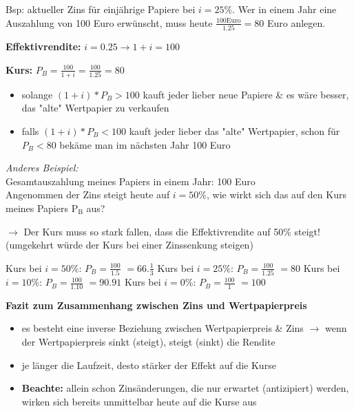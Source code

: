 \documentclass[11pt]{article}
\begin{document}
\begin{enumerate}
Bsp: aktueller Zins für einjährige Papiere bei \(i=25\%\).
Wer in einem Jahr eine Auszahlung von 100 Euro erwünscht, muss heute \(\frac{100\text{Euro}}{1.25}=80\) Euro anlegen.

\textbf{Effektivrendite:} \(i=0.25 \rightarrow 1 + i = 100\)

\textbf{Kurs:} \(P_B = \frac{100}{1+i} = \frac{100}{1.25} = 80\)

\begin{itemize}
\item solange \((1+i)*P_B > 100\) kauft jeder lieber neue Papiere \& es wäre besser, das "alte" Wertpapier zu verkaufen
\item falls \((1+i)*P_B < 100\) kauft jeder lieber das "alte" Wertpapier, schon für \(P_B < 80\) bekäme man im nächsten Jahr 100 Euro
\end{itemize}

\emph{Anderes Beispiel:}\\
Gesamtauszahlung meines Papiers in einem Jahr: 100 Euro\\
Angenommen der Zins steigt heute auf \(i=50\%\), wie wirkt sich das auf den Kurs meines Papiers P\(_{\text{B}}\) aus?

\(\rightarrow\) Der Kurs muss so stark fallen, dass die Effektivrendite auf 50\% steigt! (umgekehrt würde der Kurs bei einer Zinssenkung steigen)

Kurs bei \(i=50\%\): \(P_B=\frac{100}{1.5}\) \(=66.\frac{1}{3}\)
Kurs bei \(i=25\%\): \(P_B=\frac{100}{1.25}\) \(=80\)
Kurs bei \(i=10\%\): \(P_B=\frac{100}{1.10}\) \(=90.91\)
Kurs bei \(i=0\%\): \(P_B=\frac{100}{1}\) \(=100\)

\textbf{Fazit zum Zusammenhang zwischen Zins und Wertpapierpreis}
\begin{itemize}
\item es besteht eine inverse Beziehung zwischen Wertpapierpreis \& Zins \(\rightarrow\) wenn der Wertpapierpreis sinkt (steigt), steigt (sinkt) die Rendite
\item je länger die Laufzeit, desto stärker der Effekt auf die Kurse
\item \textbf{Beachte:} allein schon Zinsänderungen, die nur erwartet (antizipiert) werden, wirken sich bereits unmittelbar heute auf die Kurse aus
\end{itemize}


\end{enumerate}
\end{document}
